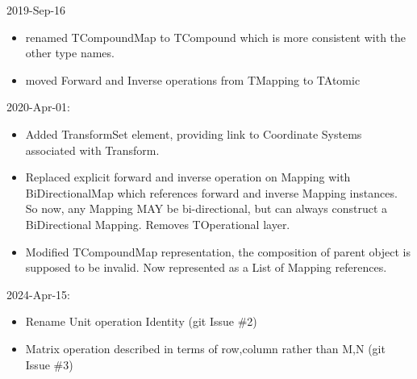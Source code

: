 \documentclass[11pt,a4paper]{ivoa}
\begin{document}
2019-Sep-16
\begin{itemize}
\item renamed TCompoundMap to TCompound which is more consistent with the other type names.
\item moved Forward and Inverse operations from TMapping to TAtomic
\end{itemize}
2020-Apr-01:
\begin{itemize}
\item Added TransformSet element, providing link to Coordinate Systems associated with Transform.
\item Replaced explicit forward and inverse operation on Mapping with BiDirectionalMap which references forward and inverse Mapping instances.  So now, any Mapping MAY be bi-directional, but can always construct a BiDirectional Mapping.  Removes TOperational layer.
\item Modified TCompoundMap representation, the composition of parent object is supposed to be invalid.  Now represented as a List of Mapping references.
\end{itemize}
2024-Apr-15:
\begin{itemize}
\item Rename Unit operation Identity (git Issue \#2)
\item Matrix operation described in terms of row,column rather than M,N (git Issue \#3)
\end{itemize}






\pagebreak

\end{document}
